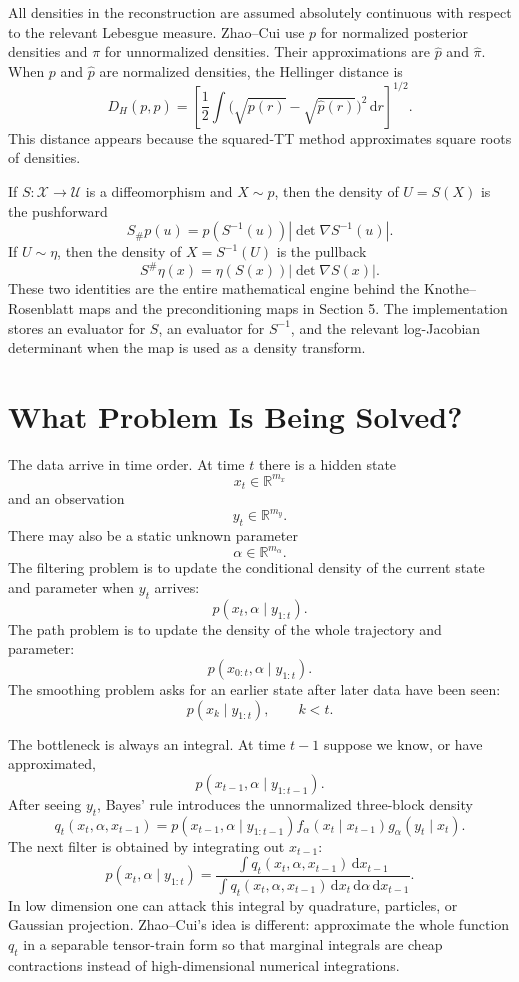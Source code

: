 \documentclass[11pt]{article}
\newcommand{\R}{\mathbb R}
\newcommand{\dd}{\,\mathrm d}
\begin{document}
All densities in the reconstruction are assumed absolutely continuous with
respect to the relevant Lebesgue measure.  Zhao--Cui use \(p\) for normalized
posterior densities and \(\pi\) for unnormalized densities.  Their
approximations are \(\widehat p\) and \(\widehat\pi\).  When \(p\) and
\(\widehat p\) are normalized densities, the Hellinger distance is
\[
    D_H(p,\widehat p)
    =
    \left[
    \frac12
    \int
    \bigl(\sqrt{p(r)}-\sqrt{\widehat p(r)}\bigr)^2\dd r
    \right]^{1/2}.
    \tag{N3}
\]
This distance appears because the squared-TT method approximates square roots
of densities.

If \(S:\mathcal X\to\mathcal U\) is a diffeomorphism and \(X\sim p\), then
the density of \(U=S(X)\) is the pushforward
\[
    S_\#p(u)
    =
    p(S^{-1}(u))\left|\det\nabla S^{-1}(u)\right|.
    \tag{N4}
\]
If \(U\sim\eta\), then the density of \(X=S^{-1}(U)\) is the pullback
\[
    S^\#\eta(x)
    =
    \eta(S(x))\left|\det\nabla S(x)\right|.
    \tag{N5}
\]
These two identities are the entire mathematical engine behind the
Knothe--Rosenblatt maps and the preconditioning maps in Section 5.  The
implementation stores an evaluator for \(S\), an evaluator for \(S^{-1}\), and
the relevant log-Jacobian determinant when the map is used as a density
transform.

\section{What Problem Is Being Solved?}

The data arrive in time order.  At time \(t\) there is a hidden state
\[
    x_t\in \R^{m_x}
\]
and an observation
\[
    y_t\in \R^{m_y}.
\]
There may also be a static unknown parameter
\[
    \alpha\in \R^{m_\alpha}.
\]
The filtering problem is to update the conditional density of the current state
and parameter when \(y_t\) arrives:
\[
    p(x_t,\alpha\mid y_{1:t}).
\]
The path problem is to update the density of the whole trajectory and parameter:
\[
    p(x_{0:t},\alpha\mid y_{1:t}).
\]
The smoothing problem asks for an earlier state after later data have been seen:
\[
    p(x_k\mid y_{1:t}),\qquad k<t.
\]

The bottleneck is always an integral.  At time \(t-1\) suppose we know, or have
approximated,
\[
    p(x_{t-1},\alpha\mid y_{1:t-1}).
\]
After seeing \(y_t\), Bayes' rule introduces the unnormalized three-block
density
\[
    q_t(x_t,\alpha,x_{t-1})
    =
    p(x_{t-1},\alpha\mid y_{1:t-1})
    f_\alpha(x_t\mid x_{t-1})
    g_\alpha(y_t\mid x_t).
\]
The next filter is obtained by integrating out \(x_{t-1}\):
\[
    p(x_t,\alpha\mid y_{1:t})
    =
    \frac{\int q_t(x_t,\alpha,x_{t-1})\dd x_{t-1}}
    {\int q_t(x_t,\alpha,x_{t-1})\dd x_t\dd\alpha\dd x_{t-1}}.
\]
In low dimension one can attack this integral by quadrature, particles, or
Gaussian projection.  Zhao--Cui's idea is different: approximate the whole
function \(q_t\) in a separable tensor-train form so that marginal integrals are
cheap contractions instead of high-dimensional numerical integrations.
\end{document}
